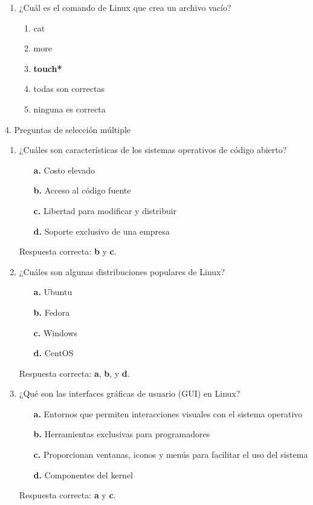 \documentclass[11pt,twoside]{book}
\begin{document}
\begin{enumerate}[label=\textbf{\arabic*.}, leftmargin=2cm]
    \item ¿Cuál es el comando de Linux que crea un archivo vacío?
    \begin{enumerate}[label=\Alph*.]
        \item cat
        \item more
        \item \textbf{touch*}
        \item todas son correctas
        \item ninguna es correcta
    \end{enumerate}

\end{enumerate}


4. Preguntas de selección múltiple

\begin{enumerate}
    \item ¿Cuáles son características de los sistemas operativos de código abierto?
    \begin{itemize}
        \item[\textbf{a.}] Costo elevado
        \item[\textbf{b.}] Acceso al código fuente
        \item[\textbf{c.}] Libertad para modificar y distribuir
        \item[\textbf{d.}] Soporte exclusivo de una empresa
    \end{itemize}
    Respuesta correcta: \textbf{b} y \textbf{c}.

    \item ¿Cuáles son algunas distribuciones populares de Linux?
    \begin{itemize}
        \item[\textbf{a.}] Ubuntu
        \item[\textbf{b.}] Fedora
        \item[\textbf{c.}] Windows
        \item[\textbf{d.}] CentOS
    \end{itemize}
    Respuesta correcta: \textbf{a}, \textbf{b}, y \textbf{d}.

    \item ¿Qué son las interfaces gráficas de usuario (GUI) en Linux?
    \begin{itemize}
        \item[\textbf{a.}] Entornos que permiten interacciones visuales con el sistema operativo
        \item[\textbf{b.}] Herramientas exclusivas para programadores
        \item[\textbf{c.}] Proporcionan ventanas, iconos y menús para facilitar el uso del sistema
        \item[\textbf{d.}] Componentes del kernel
    \end{itemize}
    Respuesta correcta: \textbf{a} y \textbf{c}.


\end{enumerate}
\end{document}
